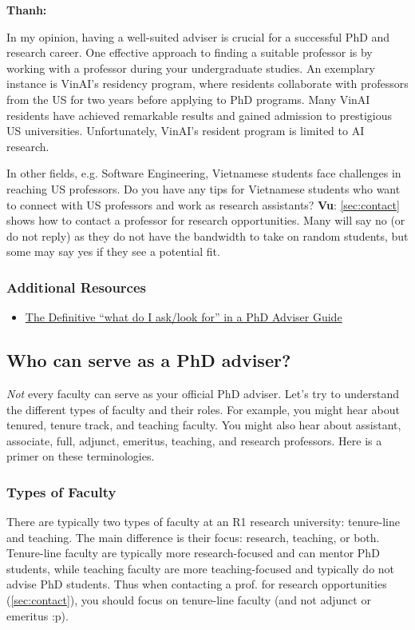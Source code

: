 \documentclass[oneside,11pt,dvipsnames]{book}
\newenvironment{commentbox}[1][]{
  \small
  \begin{mybox}
    {\small \textbf{#1}}
  }{
  \end{mybox}
}
\begin{document}
\begin{commentbox}[Thanh:]
  In my opinion, having a well-suited adviser is crucial for a successful PhD and research career. One effective approach to finding a suitable professor is by working with a professor during your undergraduate studies. An exemplary instance is VinAI's residency program, where residents collaborate with professors from the US for two years before applying to PhD programs. Many VinAI residents have achieved remarkable results and gained admission to prestigious US universities. Unfortunately, VinAI's resident program is limited to AI research.

  In other fields, e.g. Software Engineering, Vietnamese students face challenges in reaching US professors. Do you have any tips for Vietnamese students who want to connect with US professors and work as research assistants?
  \tcblower
  \textbf{Vu}: \autoref{sec:contact} shows how to contact a professor for research opportunities. Many will say no (or do not reply) as they do not have the bandwidth to take on random students, but some may say yes if they see a potential fit.
\end{commentbox}

\subsubsection*{Additional Resources}
\begin{itemize}
  \item \href{https://www.cs.columbia.edu/wp-content/uploads/2019/03/Get-Advisor.pdf}{The Definitive ``what do I ask/look for'' in a PhD Adviser Guide}
\end{itemize}
\subsection{Who can serve as a PhD adviser?}\label{sec:faculty-types}

\emph{Not} every faculty can serve as your official PhD adviser. Let's try to understand the different types of faculty and their roles. For example, you might hear about tenured,  tenure track, and teaching faculty.  You might also hear about assistant, associate, full, adjunct, emeritus, teaching, and research professors. Here is a primer on these terminologies.

\subsubsection{Types of Faculty} There are typically two types of faculty at an R1 research university: tenure-line and teaching.  The main difference is their focus: research, teaching, or both. Tenure-line faculty are typically more research-focused and can mentor PhD students, while teaching faculty are more teaching-focused and typically do not advise PhD students. Thus when contacting a prof. for research opportunities (\autoref{sec:contact}), you should focus on tenure-line faculty (and not adjunct or emeritus :p).
\end{document}
